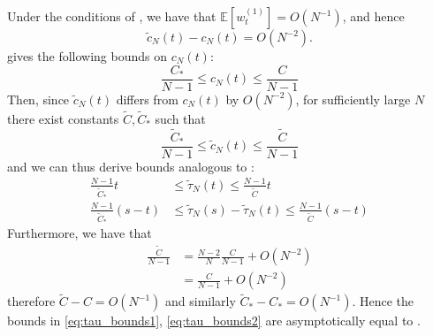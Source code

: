 \documentclass{article}
\newcommand{\E}{\mathbb{E}}
\newcommand{\wt}[2][t]{w_{#1}^{(#2)}}
\begin{document}
Under the conditions of \citet[Corollary 2]{koskela2018}, we have that $\E[\wt{1}] = O(N^{-1})$, and hence
\begin{equation*}
\tilde{c}_N(t) - c_N(t) = O(N^{-2}).
\end{equation*}
\citet{koskela2018} gives the following bounds on $c_N(t)$:
\begin{equation*}
\frac{C_*}{N-1} \leq c_N(t) \leq \frac{C}{N-1}
\end{equation*}
Then, since $\tilde{c}_N(t)$ differs from $c_N(t)$ by $O(N^{-2})$, for sufficiently large $N$ there exist constants $\tilde{C}, \tilde{C}_*$ such that
\begin{equation*}
\frac{\tilde{C}_*}{N-1} \leq \tilde{c}_N(t) \leq \frac{\tilde{C}}{N-1}
\end{equation*}
and we can thus derive bounds analogous to \citet[(5)-(6)]{koskela2018}:
\begin{align}
\frac{N-1}{\tilde{C}_*}t &\leq \tilde{\tau}_N(t) \leq \frac{N-1}{\tilde{C}}t \label{eq:tau_bounds1}\\
\frac{N-1}{\tilde{C}_*}(s-t) &\leq \tilde{\tau}_N(s) - \tilde{\tau}_N(t) \leq \frac{N-1}{\tilde{C}}(s-t) \label{eq:tau_bounds2}
\end{align}
Furthermore, we have that
\begin{align*}
\frac{\tilde{C}}{N-1} &= \frac{N-2}{N} \frac{C}{N-1} + O(N^{-2}) \\
&= \frac{C}{N-1} + O(N^{-2})
\end{align*}
therefore $\tilde{C} - C = O(N^{-1})$ and similarly $\tilde{C}_* - C_* = O(N^{-1})$. Hence the bounds in \eqref{eq:tau_bounds1}, \eqref{eq:tau_bounds2} are asymptotically equal to \citet[(5)--(6)]{koskela2018}.
\end{document}
